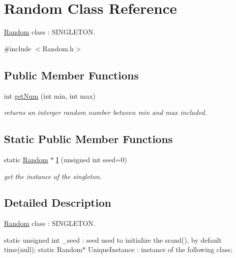 \hypertarget{class_random}{\section{Random Class Reference}
\label{class_random}
}


\hyperlink{class_random}{Random} class \+: S\+I\+N\+G\+L\+E\+T\+O\+N.  




{\ttfamily \#include $<$Random.\+h$>$}

\subsection*{Public Member Functions}
\begin{DoxyCompactItemize}
\item 
int \hyperlink{class_random_acd60981459e56d52be9b9b49dbe3de27}{get\+Num} (int min, int max)
\begin{DoxyCompactList}\small\item\em returns an interger random number between min and max included. \end{DoxyCompactList}\end{DoxyCompactItemize}
\subsection*{Static Public Member Functions}
\begin{DoxyCompactItemize}
\item 
static \hyperlink{class_random}{Random} $\ast$ \hyperlink{class_random_a3662366d5b4443291ae6e434a6bdb25d}{I} (unsigned int seed=0)
\begin{DoxyCompactList}\small\item\em get the instance of the singleton. \end{DoxyCompactList}\end{DoxyCompactItemize}


\subsection{Detailed Description}
\hyperlink{class_random}{Random} class \+: S\+I\+N\+G\+L\+E\+T\+O\+N. 

static unsigned int \+\_\+seed \+: seed used to initialize the srand(), by default time(null); static Random$\ast$ Unique\+Instance \+: instance of the following class; 

